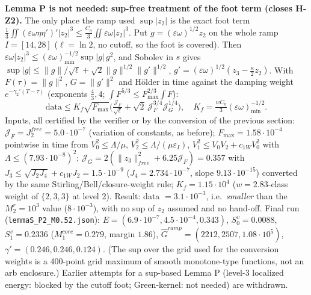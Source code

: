 \documentclass[11pt]{article}
\begin{document}
\textbf{Lemma P is not needed: sup-free treatment of the foot term (closes H-Z2).} The only place the ramp used $\sup|z_2|$ is the exact foot term $\tfrac13\iint(\varepsilon\omega\eta\eta')'|z_2|^3\le\tfrac{C_\eta}{3}\iint\varepsilon\omega|z_2|^3$. Put $g=(\varepsilon\omega)^{1/2}z_2$ on the whole ramp $I=[14,28]$ ($\ell=\ln2$, no cutoff, so the foot is covered). Then $\varepsilon\omega|z_2|^3\le(\varepsilon\omega)_{\min}^{-1/2}\sup|g|\,g^2$, and Sobolev in $s$ gives $\sup|g|\le\|g\|/\sqrt\ell+\sqrt2\|g\|^{1/2}\|g'\|^{1/2}$, $g'=(\varepsilon\omega)^{1/2}(z_3-\tfrac\kappa2z_2)$. With $F(\tau)=\|g\|^2$, $G=\|g'\|^2$ and Hölder in time against the damping weight $e^{-\gamma_2'(T-\tau)}$ (exponents $\tfrac43,4$; $\int F^{5/3}\le F_{\max}^{2/3}\int F$):
$$\text{data}\le K_f\sqrt{F_{\max}}\Big(\tfrac{\mathcal J_F}{\sqrt\ell}+\sqrt2\,\mathcal J_F^{3/4}\mathcal J_G^{1/4}\Big),\quad K_f=\tfrac{wC_\eta}{3}(\varepsilon\omega)_{\min}^{-1/2}.$$
Inputs, all certified by the verifier or by the conversion of the previous section: $\mathcal J_F=J_2^{free}=5.0\cdot10^{-7}$ (variation of constants, as before); $F_{\max}=1.58\cdot10^{-4}$ pointwise in time from $V_0^2\le\Lambda/\mu$, $V_2^2\le\Lambda/(\mu\varepsilon_I)$, $V_1^2\le V_0V_2+c_{1W}V_0^2$ with $\Lambda\le(7.93\cdot10^{-8})^2$; $\mathcal J_G=2(\|z_3\|^2_{free}+6.25\mathcal J_F)=0.357$ with $J_3\le\sqrt{J_2J_4}+c_{1W}J_2=1.5\cdot10^{-9}$ ($J_4=2.734\cdot10^{-7}$, slope $9.13\cdot10^{-15}$) converted by the same Stirling/Bell/closure-weight rule; $K_f=1.15\cdot10^4$ ($w=2.83$-class weight of $\{2,3,3\}$ at level 2). Result: data $=3.1\cdot10^{-3}$, i.e.\ \emph{smaller} than the $M_2^r=10^3$ value ($8\cdot10^{-3}$), with no sup of $z_2$ assumed and no hand-off. Final run (\texttt{lemmaS\_P2\_M0.52.json}): $E=(6.9\cdot10^{-7},4.5\cdot10^{-4},0.343)$, $S_0^v=0.0088$, $S_1^v=0.2336$ ($M_1^{core}=0.279$, margin $\mathbf{1.86}$), $\hat G^{ramp}=(2212,2507,1.08\cdot10^5)$, $\gamma'=(0.246,0.246,0.124)$. (The sup over the grid used for the conversion weights is a 400-point grid maximum of smooth monotone-type functions, not an arb enclosure.) Earlier attempts for a sup-based Lemma P (level-3 localized energy: blocked by the cutoff foot; Green-kernel: not needed) are withdrawn.
\end{document}
